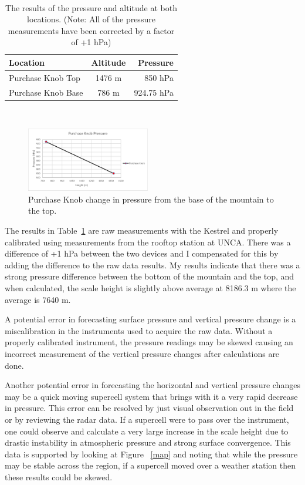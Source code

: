 \documentclass[twocolumn]{article}
\begin{document}
\begin{table}[t!] %
\centering
\caption{
\\The results of the pressure and altitude at both locations. (Note: All of the pressure measurements have been corrected by a factor of +1 hPa)}
\label{presdata}
\begin{tabular}{|l||c|r|}
\hline
Location &  Altitude & Pressure\\
\hline \hline
Purchase Knob Top & 1476 m & 850 hPa\\
\hline
Purchase Knob Base & 786 m & 924.75 hPa\\
\hline
\end{tabular}
\end{table}
\\

%
\begin{figure}[!t] %
\begin{center}
\includegraphics[angle=0, width=0.48\textwidth]{PurchaseKnob}
\end{center}
\caption{
Purchase Knob change in pressure from the base of the mountain to the top.
\label{Pknob}
}
\end{figure}
%


The results in Table~\ref{presdata} are raw measurements with the Kestrel and properly calibrated using measurements from the rooftop station at UNCA. There was a difference of +1 hPa between the two devices and I compensated for this by adding the difference to the raw data results. My results indicate that there was a strong pressure difference between the bottom of the mountain and the top, and when calculated, the scale height is slightly above average at 8186.3 m where the average is 7640 m.

A potential error in forecasting surface pressure and vertical pressure change is a miscalibration in the instruments used to acquire the raw data. Without a properly calibrated instrument, the pressure readings may be skewed causing an incorrect measurement of the vertical pressure changes after calculations are done.

Another potential error in forecasting the horizontal and vertical pressure changes may be a quick moving supercell system that brings with it a very rapid decrease in pressure. This error can be resolved by just visual observation out in the field or by reviewing the radar data. If a supercell were to pass over the instrument, one could observe and calculate a very large increase in the scale height due to drastic instability in atmospheric pressure and strong surface convergence. This data is supported by looking at Figure ~\ref{map} and noting that while the pressure may be stable across the region, if a supercell moved over a weather station then these results could be skewed.
\end{document}
